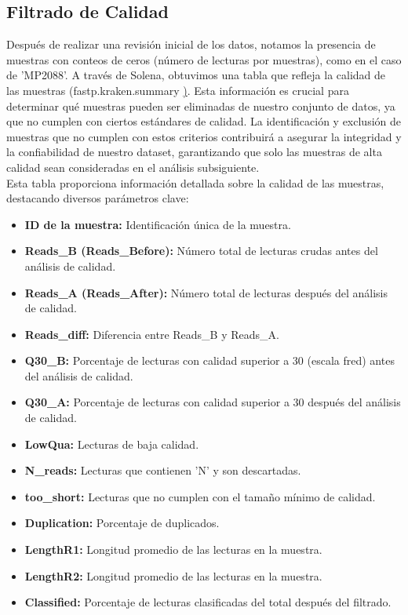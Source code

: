 \subsection{Filtrado de Calidad}

Después de realizar una revisión inicial de los datos, notamos la presencia de muestras con conteos de ceros (número de lecturas por muestras), como en el caso de 'MP2088'. A través de Solena, obtuvimos una tabla que refleja la calidad de las muestras (fastp.kraken.summary \href{https://github.com/CamilaSilva1995/Tesis_Maestria/blob/main/Analisis_Comparativo/Fresa_Solena/01_Exploracion.pdf}). Esta información es crucial para determinar qué muestras pueden ser eliminadas de nuestro conjunto de datos, ya que no cumplen con ciertos estándares de calidad. La identificación y exclusión de muestras que no cumplen con estos criterios contribuirá a asegurar la integridad y la confiabilidad de nuestro dataset, garantizando que solo las muestras de alta calidad sean consideradas en el análisis subsiguiente.\\

Esta tabla proporciona información detallada sobre la calidad de las muestras, destacando diversos parámetros clave:
\begin{itemize}
  \item \textbf{ID de la muestra:} Identificación única de la muestra.
  \item \textbf{Reads\_B  (Reads\_Before):} Número total de lecturas crudas antes del análisis de calidad.
  \item \textbf{Reads\_A (Reads\_After):} Número total de lecturas después del análisis de calidad.
  \item \textbf{Reads\_diff:}  Diferencia entre Reads\_B y Reads\_A.
  \item \textbf{Q30\_B:} Porcentaje de lecturas con calidad superior a 30 (escala fred) antes del análisis de calidad.
  \item \textbf{Q30\_A:} Porcentaje de lecturas con calidad superior a 30 después del análisis de calidad.
  \item \textbf{LowQua:} Lecturas de baja calidad.
  \item \textbf{N\_reads:} Lecturas que contienen 'N' y son descartadas.
  \item \textbf{too\_short:}  Lecturas que no cumplen con el tamaño mínimo de calidad.
  \item \textbf{Duplication:} Porcentaje de duplicados.
  \item \textbf{LengthR1:} Longitud promedio de las lecturas en la muestra.
  \item \textbf{LengthR2:} Longitud promedio de las lecturas en la muestra.
  \item \textbf{Classified:} Porcentaje de lecturas clasificadas del total después del filtrado.
\end{itemize}

